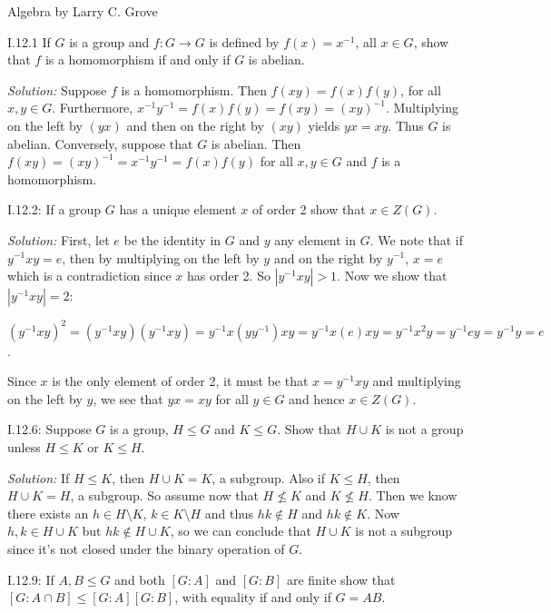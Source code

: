\documentclass{letter}
\newcommand{\nin}{\not\in}
\newcommand{\tmem}[1]{{\em #1\/}}
\begin{document}
Algebra by Larry C. Grove

I.12.1 If $G$ is a group and $f : G \rightarrow G$ is defined by $f (x) = x^{-
1}$, all $x \in G$, show that $f$ is a homomorphism if and only if $G$ is
abelian.

{\tmem{Solution:}} Suppose $f$ is a homomorphism. Then $f (x y) = f (x) f
(y)$, for all $x, y \in G$. Furthermore, $x^{- 1} y^{- 1} = f (x) f (y) = f (x
y) = (x y)^{- 1}$. Multiplying on the left by $(y x)$ and then on the right by
$(x y)$ yields $y x = x y$. Thus $G$ is abelian. Conversely, suppose that $G$
is abelian. Then $f (x y) = (x y)^{- 1} = x^{- 1} y^{- 1} = f (x) f (y)$ for
all $x, y \in G$ and $f$ is a homomorphism.

I.12.2: If a group $G$ has a unique element $x$ of order 2 show that $x \in Z
(G)$.

{\tmem{Solution:}} First, let $e$ be the identity in $G$ and $y$ any element
in $G$. We note that if $y^{- 1} x y = e$, then by multiplying on the left by
$y$ and on the right by $y^{- 1}$, $x = e$ which is a contradiction since $x$
has order 2. So $|y^{- 1} x y| > 1$. Now we show that $|y^{- 1} x y| = 2$:

$(y^{- 1} x y)^2 = (y^{- 1} x y) (y^{- 1} x y) = y^{- 1} x (y y^{- 1}) x y =
y^{- 1} x (e) x y = y^{- 1} x^2 y = y^{- 1} e y = y^{- 1} y = e$.

Since $x$ is the only element of order 2, it must be that $x = y^{- 1} x y$
and multiplying on the left by $y$, we see that $y x = x y$ for all $y \in G$
and hence $x \in Z (G)$.

I.12.6: Suppose $G$ is a group, $H \leq G$ and $K \leq G$. Show that $H \cup
K$ is not a group unless $H \leq K$ or $K \leq H$.

{\tmem{Solution:}} If $H \leq K$, then $H \cup K = K$, a subgroup. Also if $K
\leq H$, then $H \cup K = H$, a subgroup. So assume now that $H \nleq K$ and
$K \nleq H$. Then we know there exists an $h \in H \setminus K$, $k \in K
\setminus H$ and thus $h k \nin H$ and $h k \nin K$. Now $h, k \in H \cup K$
but $h k \nin H \cup K$, so we can conclude that $H \cup K$ is not a subgroup
since it's not closed under the binary operation of $G$.

I.12.9: If $A, B \leq G$ and both $[G : A]$ and $[G : B]$ are finite show that
$[G : A \cap B] \leq [G : A] [G : B]$, with equality if and only if $G = A B$.
\end{document}

